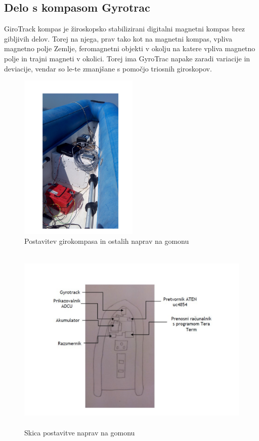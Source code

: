\subsection{Delo s kompasom Gyrotrac}
GiroTrack kompas je žiroskopsko stabilizirani digitalni magnetni kompas brez gibljivih delov. Torej na njega, prav tako kot na magnetni kompas, vpliva magnetno polje Zemlje, feromagnetni objekti v okolju na katere vpliva magnetno polje in trajni magneti v okolici. Torej ima GyroTrac napake zaradi variacije in deviacije, vendar so le-te zmanjšane s pomočjo triosnih giroskopov.

\begin{figure}
	\centering
	\includegraphics[height=8cm]{Vaje/VzorecPoroc/figs/Postavitev_gumenjak.pdf}
	\caption{Postavitev girokompasa in ostalih naprav na gomonu}
	\label{fig:GT_gum}       %
\end{figure}

\begin{figure}
	\centering
	\includegraphics[height=9cm]{Vaje/VzorecPoroc/figs/Razporeditev_opreme.pdf}
	\caption{Skica postavitve naprav na gomonu}
	\label{fig:gum_tloris}       %
\end{figure}


